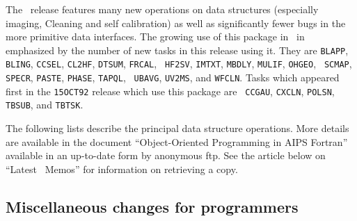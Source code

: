    The \RELEASENAME\ release features many new operations on data
structures (especially imaging, Cleaning and self calibration) as well
as significantly fewer bugs in the more primitive data interfaces.
The growing use of this package in \AIPS\ in emphasized by the number
of new tasks in this release using it.  They are {\tt BLAPP}, {\tt
BLING}, {\tt CCSEL}, {\tt CL2HF}, {\tt DTSUM}, {\tt FRCAL}, {\tt
HF2SV}, {\tt IMTXT}, {\tt MBDLY}, {\tt MULIF}, {\tt OHGEO}, {\tt
SCMAP}, {\tt SPECR}, {\tt PASTE}, {\tt PHASE}, {\tt TAPQL}, {\tt
UBAVG}, {\tt UV2MS}, and \hbox{{\tt WFCLN}}.  Tasks which appeared
first in the {\tt 15OCT92} release which use this package are {\tt
CCGAU}, {\tt CXCLN}, {\tt POLSN}, {\tt TBSUB}, and \hbox{{\tt TBTSK}}.

The following lists describe the principal data structure operations.
More details are available in the document ``Object-Oriented
Programming in AIPS Fortran'' available in an up-to-date form by
anonymous ftp.  See the article below on ``Latest \AIPS\ Memos'' for
information on retrieving a copy.


\subsection{Miscellaneous changes for programmers}

